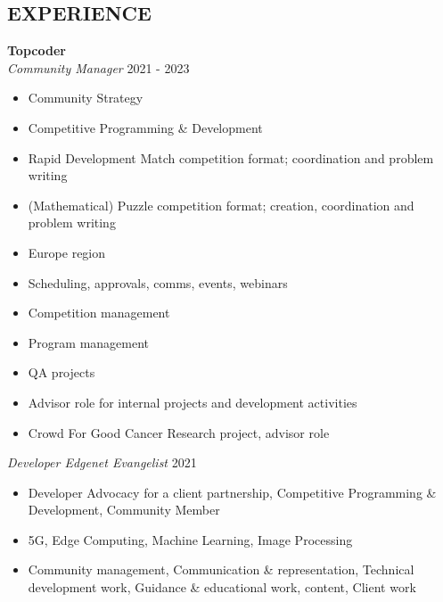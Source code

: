 \documentclass[margin, 10pt]{res} %
\begin{document}
\begin{resume}

%
%

 
\section{EXPERIENCE}
  
 \textbf{Topcoder}\\
 {\sl Community Manager} \hfill 2021 - 2023 \\
 \begin{itemize}
 	\item Community Strategy
 	\item Competitive Programming \& Development
 	\item Rapid Development Match competition format; coordination and problem writing
 	\item (Mathematical) Puzzle competition format; creation, coordination and problem writing
 	\item Europe region
 	\item Scheduling, approvals, comms, events, webinars
 	\item Competition management
 	\item Program management
 	\item QA projects
 	\item Advisor role for internal projects and development activities
 	\item Crowd For Good Cancer Research project, advisor role
 \end{itemize}
 {\sl Developer Edgenet Evangelist} \hfill 2021 
 \begin{itemize} \itemsep -2pt %
 	\item Developer Advocacy for a client partnership, Competitive Programming \& \\ Development, Community Member
 	\item 5G, Edge Computing, Machine Learning, Image Processing
 	\item Community management, Communication \& representation, Technical development work, Guidance \& educational work, content, Client work
 \end{itemize}


\end{resume}
\end{document}
